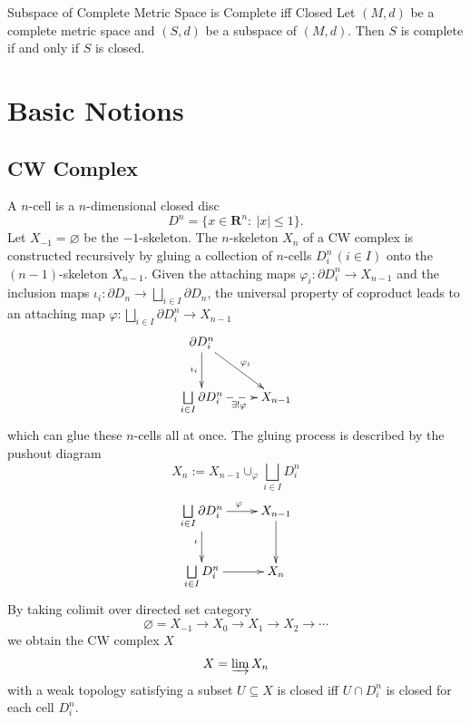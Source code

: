 \documentclass{report}
\begin{document}
\begin{proposition}{Subspace of Complete Metric Space is Complete iff Closed}{}
	Let $(M, d)$ be a complete metric space and $(S, d)$ be a subspace of $(M, d)$. Then $S$ is complete if and only if $S$ is closed.
\end{proposition}


\chapter{Basic Notions}
\section{CW Complex}
A $n$-cell is a $n$-dimensional closed disc
\[
	D^n=\{x\in\mathbf{R}^n:\ |x|\le 1\}.
\]
Let $X_{-1}=\varnothing$ be the $-1$-skeleton. The $n$-skeleton $X_n$ of a CW complex is constructed recursively by gluing a collection of $n$-cells $D^n_i\,(i\in I)$ onto the $(n-1)$-skeleton $X_{n-1}$. Given the attaching maps $\varphi_i:\partial D^n_i\to X_{n-1}$ and the inclusion maps $\iota_i:\partial D_n\to \bigsqcup\limits_{i\in I}\partial D_n$, the universal property of coproduct leads to an attaching map $\varphi:\bigsqcup\limits_{i\in I}\partial D^n_i\to X_{n-1}$
\[\xymatrix{
	\partial D^n_i\ar[rd]^{\varphi_i}\ar[d]_{\iota_i}&\\
	\bigsqcup\limits_{i\in I}\partial D^n_i\ar@{-->}[r]_{\exists!\varphi} &X_{n-1}
	}\]
which can glue these $n$-cells all at once. The gluing process is described by the pushout diagram
\[
	X_{n}:=X_{n-1}\cup_{\varphi}\bigsqcup\limits_{i\in I} D^n_i
\]
\[\xymatrix{
	\bigsqcup\limits_{i\in I}\partial D^n_i\ar[r]^{\varphi}\ar[d]_{\iota}  &X_{n-1}\ar[d]_{}\\
	\bigsqcup\limits_{i\in I} D^n_i\ar@{->}[r]_{}&X_{n}
	}\]
By taking colimit over directed set category
$$
	\varnothing=X_{-1} \rightarrow X_0 \rightarrow X_1 \rightarrow X_2 \rightarrow \cdots
$$
we obtain the CW complex $X$
\[
	X=\varinjlim X_n
\]
with a weak topology satisfying a subset $U \subseteq X$ is closed iff $U \cap D^n_i$ is closed for each cell $D^n_i$.
\end{document}
